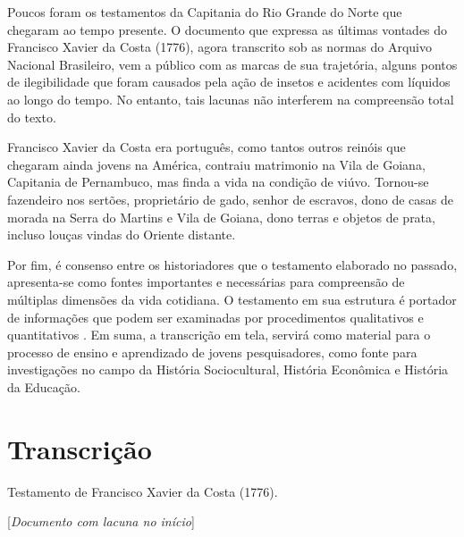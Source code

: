 \begin{refsection}
    Poucos foram os testamentos da Capitania do Rio Grande do Norte que chegaram ao tempo presente. O documento que expressa as últimas vontades do Francisco Xavier da Costa (1776), agora transcrito sob as normas do Arquivo Nacional Brasileiro, vem a público com as marcas de sua trajetória, alguns pontos de ilegibilidade que foram causados pela ação de insetos e acidentes com líquidos ao longo do tempo. No entanto, tais lacunas não interferem na compreensão total do texto. 

    Francisco Xavier da Costa era português, como tantos outros reinóis que chegaram ainda jovens na América, contraiu matrimonio na Vila de Goiana, Capitania de Pernambuco, mas finda a vida na condição de viúvo. Tornou-se fazendeiro nos sertões, proprietário de gado, senhor de escravos, dono de casas de morada na Serra do Martins e Vila de Goiana, dono terras e objetos de prata, incluso louças vindas do Oriente distante. 

    Por fim, é consenso entre os historiadores que o testamento elaborado no passado, apresenta-se como fontes importantes e necessárias para compreensão de múltiplas dimensões da vida cotidiana. O testamento em sua estrutura é portador de informações que podem ser examinadas por procedimentos qualitativos e quantitativos \cite{MARCÍLIO1983morte, RODRIGUESAndDILLMANN2013Desejando, SANTOS2013Por}. Em suma, a transcrição em tela, servirá como material para o processo de ensino e aprendizado de jovens pesquisadores, como fonte para investigações no campo da História Sociocultural, História Econômica e História da Educação.  

    \section{Transcrição}

    \vspace{5mm}

    Testamento de Francisco Xavier da Costa (1776).

    \vspace{1em}

    \noindent{}[\textit{Documento com lacuna no início}]

    \vspace{1em}


\end{refsection}
